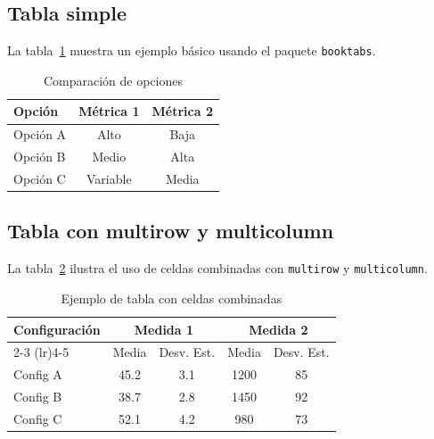 \subsection{Tabla simple}
La tabla~\ref{tab:simple} muestra un ejemplo básico usando el paquete \texttt{booktabs}.
\begin{table}[htbp]
  \centering
  \caption{Comparación de opciones}
  \label{tab:simple}
  \begin{tabular}{lcc}
    \toprule
    \textbf{Opción} & \textbf{Métrica 1} & \textbf{Métrica 2} \\
    \midrule
    Opción A & Alto & Baja \\
    Opción B & Medio & Alta \\
    Opción C & Variable & Media \\
    \bottomrule
  \end{tabular}
\end{table}

\subsection{Tabla con multirow y multicolumn}
La tabla~\ref{tab:compleja} ilustra el uso de celdas combinadas con \texttt{multirow} y \texttt{multicolumn}.
\begin{table}[htbp]
  \centering
  \caption{Ejemplo de tabla con celdas combinadas}
  \label{tab:compleja}
  \begin{tabular}{lcccc}
    \toprule
    \multirow{2}{*}{\textbf{Configuración}} & \multicolumn{2}{c}{\textbf{Medida 1}} & \multicolumn{2}{c}{\textbf{Medida 2}} \\
    \cmidrule(lr){2-3} \cmidrule(lr){4-5}
    & Media & Desv. Est. & Media & Desv. Est. \\
    \midrule
    Config A & 45.2 & 3.1 & 1200 & 85 \\
    Config B & 38.7 & 2.8 & 1450 & 92 \\
    Config C & 52.1 & 4.2 & 980 & 73 \\
    \bottomrule
  \end{tabular}
\end{table}

